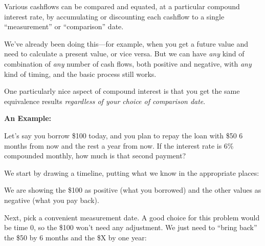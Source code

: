 \documentclass[14pt,twoside]{extarticle}
\begin{document}

Various cashflows can be compared and equated, at a particular compound interest rate, by
accumulating or discounting each cashflow to a single ``measurement'' or ``comparison'' date.

We've already been doing this---for example, when you get a future value and need to calculate a
present value, or vice versa.  But we can have \emph{any} kind of combination of \emph{any} number
of cash flows, both positive and negative, with \emph{any} kind of timing, and the basic process still works.

One particularly nice aspect of compound interest is that you get the same equivalence results
\emph{regardless of your choice of comparison date}.

\vspace{.2in}
\textbf{An Example:}

Let's say you borrow \$100 today, and you plan to repay the loan with \$50 6 months from now and the rest a year
from now.  If the interest rate is 6\% compounded monthly, how much is that second payment?

We start by drawing a timeline, putting what we know in the appropriate places:

\begin{center}
\end{center}

We are showing the \$100 as positive (what you borrowed) and the other values as negative (what you pay back).

Next, pick a convenient measurement date.  A good choice for this problem would be time 0, so
the \$100 won't need any adjustment.  We just need to ``bring back'' the \$50 by 6 months and
the \$X by one year:
\end{document}
